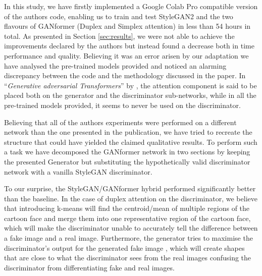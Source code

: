 \documentclass{article}
\begin{document}
	In this study, we have firstly implemented a Google Colab Pro compatible version of the authors 
	code, 
	enabling us to train and test StyleGAN2 and the two flavours of GANformer (Duplex and Simplex 
	attention) 
	in less than 54 hours in total.
	As presented in Section \ref{sec:results}, we were not able to achieve the improvements declared by 
	the authors but instead 
	found a decrease both in time performance and quality.
	Believing it was an error arisen by our adaptation we have analysed the pre-trained models provided 
	and 
	noticed an alarming discrepancy between the code and the methodology discussed in the paper.
	In ``\emph{Generative adversarial Transformers}'' by \citet{hudson2021generative}, the attention 
	component 
	is said to be placed both on the generator and the discriminator sub-networks, while in all the 
	pre-trained 
	models provided, it seems to never be used on the discriminator.
	
	
	Believing that all of the authors experiments were performed on a different network than the one 
	presented 
	in the publication, we have tried to recreate the structure that could have yielded the claimed 
	qualitative results.
	To perform such a task we have decomposed the GANformer network in two sections by keeping 
	the presented 
	Generator but substituting the hypothetically valid discriminator network with a vanilla StyleGAN 
	discriminator.
	
	To our surprise, the StyleGAN/GANformer hybrid performed significantly better than the baseline. In 
	the case of duplex attention on the discriminator, we believe that introducing k-means will find the 
	centroid/mean of multiple regions of the cartoon face and merge them into one representative region 
	of the cartoon face, which will make the discriminator unable to accurately tell the difference 
	between a fake image and a real image. Furthermore, the generator tries to maximise the 
	discriminator's output for the generated fake image \cite{gulrajani_improved_2017, 
	arjovsky_wasserstein_2017}, which will create shapes that are close to what the discriminator sees 
	from the real images confusing the discriminator from differentiating fake and real images.
	
\end{document}
